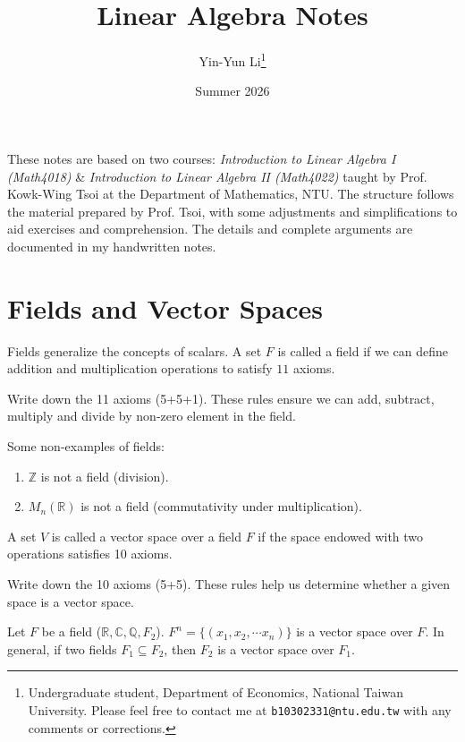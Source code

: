 \documentclass[12pt]{article}
\title{Linear Algebra Notes}
\author{Yin-Yun Li\thanks{Undergraduate student, Department of Economics, National Taiwan University. Please feel free to contact me at \texttt{b10302331@ntu.edu.tw} with any comments or corrections.}}
\date{Summer 2026}
\begin{document}
\maketitle

These notes are based on two courses: \emph{Introduction to Linear Algebra I (Math4018)} \& \emph{Introduction to Linear Algebra II (Math4022)} taught by Prof. Kowk-Wing Tsoi at the Department of Mathematics, NTU. 
The structure follows the material prepared by Prof. Tsoi, with some adjustments and simplifications to aid exercises and comprehension. 
The details and complete arguments are documented in my handwritten notes.




\newpage
\tableofcontents


\newpage
\section{Fields and Vector Spaces}

Fields generalize the concepts of scalars. A set $F$ is called a field if we can define addition and multiplication operations to satisfy $11$ axioms.
\begin{exercise}
Write down the 11 axioms (5+5+1). These rules ensure we can add, subtract, multiply and divide by non-zero element in the field.
\end{exercise}

\begin{example}
    Some non-examples of fields:
    \begin{enumerate}
        \item $\mathbb{Z}$ is not a field (division).
        \item $M_n(\mathbb{R})$ is not a field (commutativity under multiplication).
    \end{enumerate}
\end{example}

A set $V$ is called a vector space over a field $F$ if the space endowed with two operations satisfies 10 axioms.
\begin{exercise}
Write down the 10 axioms (5+5). 
These rules help us determine whether a given space is a vector space.
\end{exercise}

\begin{example}
    Let $F$ be a field ($\mathbb{R}, \mathbb{C}, \mathbb{Q}, F_2$).
    $F^n = \{(x_1,x_2,\cdots x_n)\}$ is a vector space over $F$.
    In general, if two fields $F_1\subseteq F_2$, then $F_2$ is a vector space over $F_1$.
\end{example}
\end{document}
